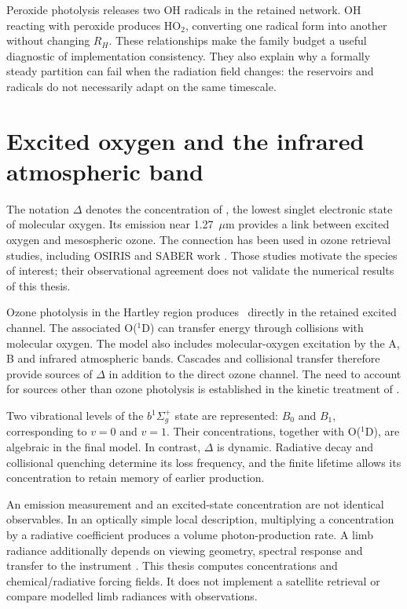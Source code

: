 Peroxide photolysis releases two OH radicals in the retained network. OH reacting with peroxide produces HO$_2$, converting one radical form into another without changing $R_H$. These relationships make the family budget a useful diagnostic of implementation consistency. They also explain why a formally steady partition can fail when the radiation field changes: the reservoirs and radicals do not necessarily adapt on the same timescale.

\section{Excited oxygen and the infrared atmospheric band}
The notation $\Delta$ denotes the concentration of \singlet, the lowest singlet electronic state of molecular oxygen. Its emission near 1.27~$\mu$m provides a link between excited oxygen and mesospheric ozone. The connection has been used in ozone retrieval studies, including OSIRIS and SABER work \citep{li2020,mlynczak2007}. Those studies motivate the species of interest; their observational agreement does not validate the numerical results of this thesis.

Ozone photolysis in the Hartley region produces \singlet\ directly in the retained excited channel. The associated O($^1$D) can transfer energy through collisions with molecular oxygen. The model also includes molecular-oxygen excitation by the A, B and infrared atmospheric bands. Cascades and collisional transfer therefore provide sources of $\Delta$ in addition to the direct ozone channel. The need to account for sources other than ozone photolysis is established in the kinetic treatment of \citet{mlynczak1993}.

Two vibrational levels of the $b^1\Sigma_g^+$ state are represented: $B_0$ and $B_1$, corresponding to $v=0$ and $v=1$. Their concentrations, together with O($^1$D), are algebraic in the final model. In contrast, $\Delta$ is dynamic. Radiative decay and collisional quenching determine its loss frequency, and the finite lifetime allows its concentration to retain memory of earlier production.

An emission measurement and an excited-state concentration are not identical observables. In an optically simple local description, multiplying a concentration by a radiative coefficient produces a volume photon-production rate. A limb radiance additionally depends on viewing geometry, spectral response and transfer to the instrument \citep{mlynczak2007}. This thesis computes concentrations and chemical/radiative forcing fields. It does not implement a satellite retrieval or compare modelled limb radiances with observations.

